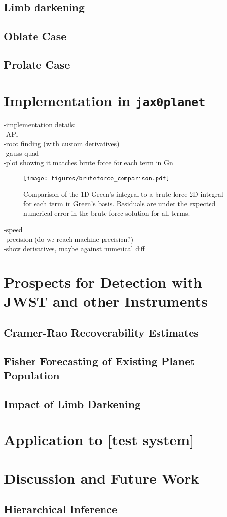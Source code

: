 \documentclass[twocolumn]{aastex631}
\begin{document}
\subsection{Limb darkening}
\subsection{Oblate Case}
\subsection{Prolate Case}
\section{Implementation in \lowercase{\texttt{jax0planet}}} \label{sec:jax0planet}
-implementation details:\\
    -API\\
    -root finding (with custom derivatives)\\
    -gauss quad\\
    -plot showing it matches brute force for each term in Gn   \\
\begin{figure}[ht!]
    \begin{centering}
        \texttt{[image: figures/bruteforce\_comparison.pdf]}
        \caption{Comparison of the 1D Green's integral to a brute force 2D integral for each term in Green's basis. Residuals are under the expected numerical error in the brute force solution for all terms.
        }
        \label{fig:bruteforce_comparison}
    \end{centering}
\end{figure}

-speed\\
-precision (do we reach machine precision?)\\
-show derivatives, maybe against numerical diff\\
\section{Prospects for Detection with JWST and other Instruments}
\label{sec:jwstdetect}

\subsection{Cramer-Rao Recoverability Estimates}
\label{sec:rec}

\subsection{Fisher Forecasting of Existing Planet Population}
\label{sec:fisherforecasting}
\subsection{Impact of Limb Darkening}
\section{Application to [test system]}
\label{sec:lctest}
\section{Discussion and Future Work}
\label{disc}
\subsection{Hierarchical Inference}

\end{document}
